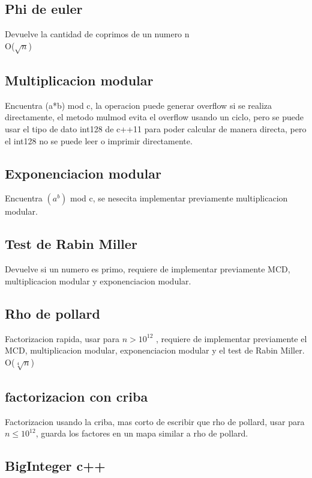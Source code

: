 \documentclass[10pt,landscape,twocolumn,a4paper,notitlepage]{article}
\newcommand\cppfile[2][]{

}
\begin{document}
			\subsection{Phi de euler}
			Devuelve la cantidad de coprimos de un numero n\\
			O($\sqrt{n}$)
			\cppfile[5-16]{matematicas/phi_de_euler.cpp}
			\subsection{Multiplicacion modular}
			Encuentra (a*b) mod c, la operacion puede generar overflow
				si se realiza directamente, el metodo mulmod evita el overflow usando un
				ciclo, pero se puede usar el tipo de dato int128 de c++11 para poder calcular
				de manera directa, pero el int128 no se puede leer o imprimir directamente.
			\cppfile[5-26]{matematicas/multiplicacion_modular.cpp}
			\subsection{Exponenciacion modular}
			Encuentra $(a^b)$ mod c, se nesecita implementar previamente multiplicacion modular.
			\cppfile[16-20]{matematicas/exp_modular.cpp}
			\subsection{Test de Rabin Miller}
			Devuelve si un numero es primo, requiere de implementar previamente MCD, multiplicacion
			modular y exponenciacion modular.
			\cppfile[29-52]{matematicas/test_de_rabin_miller.cpp}
			\subsection{Rho de pollard}
			Factorizacion rapida, usar para $n > 10^{12}$ , requiere de implementar previamente el MCD, 
			multiplicacion modular,	exponenciacion modular y el test de Rabin Miller.\\
			O($\sqrt[4]{n}$)
			\cppfile[54-92]{matematicas/rho_de_pollard.cpp}
			\subsection{factorizacion con criba}
			Factorizacion usando la criba, mas corto de escribir que rho de pollard, usar
			para $n \leq 10^{12}$, guarda los factores en un mapa similar a rho de pollard.
			\cppfile[10-54]{matematicas/factorizacion_criba.cpp}
			\subsection{BigInteger c++}
			\cppfile[4-207]{matematicas/biginteger.cpp}
\end{document}
